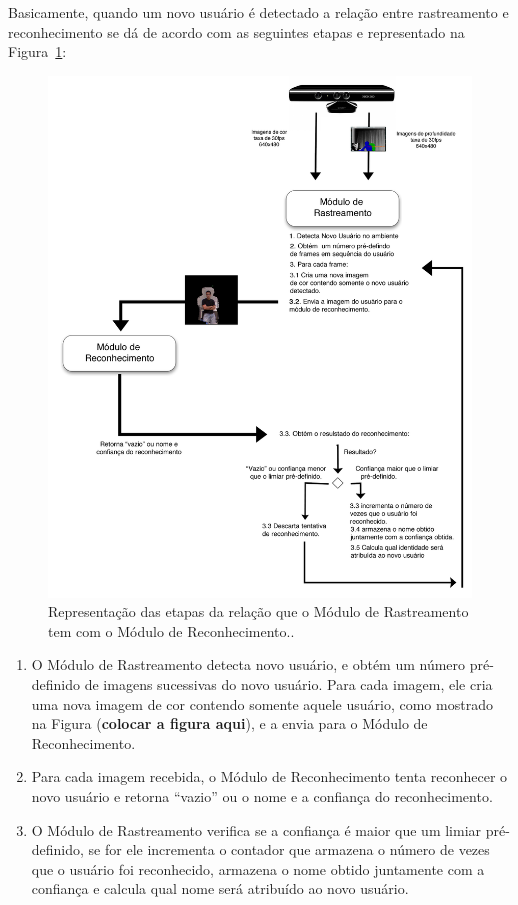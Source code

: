 	Basicamente, quando um novo usuário é detectado a relação entre rastreamento e reconhecimento se dá de acordo com as seguintes etapas e representado na Figura~\ref{fig:rastreamento-reconhecimento}:

		\begin{figure}[hbt]
			\begin{center}
				\includegraphics[scale=1.5]{figuras/4.ProblemaEProposta/esquema-tracker-reco.png}
			\end{center}
			\caption{Representação das etapas da relação que o Módulo de Rastreamento tem com o Módulo de Reconhecimento..}
			\label{fig:rastreamento-reconhecimento}
		\end{figure}
	
		\begin{enumerate}
		 	\item O Módulo de Rastreamento detecta novo usuário, e obtém um número pré-definido de imagens sucessivas do novo usuário. Para cada imagem, ele cria uma nova imagem de cor contendo somente aquele usuário, como mostrado na Figura (\textbf{colocar a figura aqui}), e a envia para o Módulo de Reconhecimento.
		 	\item Para cada imagem recebida, o Módulo de Reconhecimento tenta reconhecer o novo usuário e retorna ``vazio'' ou o nome e a confiança do reconhecimento.
		 	\item O Módulo de Rastreamento verifica se a confiança é maior que um limiar pré-definido, se for ele incrementa o contador que armazena o número de vezes que o usuário foi reconhecido, armazena o nome obtido juntamente com a confiança e calcula qual nome será atribuído ao novo usuário.
	 	\end{enumerate} 
	
